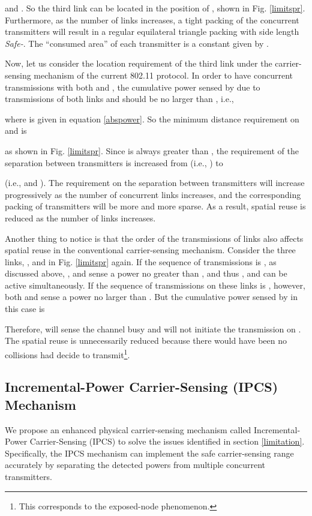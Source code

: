 \documentclass[conference]{IEEEtran}
\begin{document}
and . So the third
link can be located in the position of , shown in Fig.
\ref{limitspr}. Furthermore, as the number of links increases, a
tight packing of the concurrent transmitters will result in a
regular equilateral triangle packing with side length
\emph{Safe-}. The ``consumed area''
of each transmitter is a constant given by
.

Now, let us consider the location requirement of the third link
 under the carrier-sensing mechanism of the current 802.11
protocol. In order to have concurrent transmissions with both 
and , the cumulative power sensed by  due to transmissions
of both links  and  should be no larger than ,
i.e.,

where  is given in equation \eqref{abspower}. So the minimum
distance requirement on  and  is

as shown in Fig. \ref{limitspr}. Since  is
always greater than , the requirement of the separation between
transmitters is increased from
 (i.e.,
) to

(i.e.,  and ). The requirement on the
separation between transmitters will increase progressively as the
number of concurrent links increases, and the corresponding packing
of transmitters will be more and more sparse. As a result, spatial
reuse is reduced as the number of links increases.

Another thing to notice is that the order of the transmissions of
links also affects spatial reuse in the conventional carrier-sensing
mechanism. Consider the three links, ,  and  in Fig.
\ref{limitspr} again. If the sequence of transmissions is , as discussed above, ,  and  sense a power
no greater than , and thus ,  and  can be
active simultaneously. If the sequence of transmissions on these
links is , however, both  and  sense a
power no larger than . But the cumulative power sensed by
 in this case is

Therefore,  will sense the channel busy and will not initiate
the transmission on . The spatial reuse is unnecessarily
reduced because there would have been no collisions had  decide
to transmit\footnote[8]{This corresponds to the exposed-node
phenomenon.}.



\subsection{Incremental-Power Carrier-Sensing (IPCS) Mechanism}
We propose an enhanced physical carrier-sensing mechanism called
Incremental-Power Carrier-Sensing (IPCS) to solve the issues
identif\/ied in section \ref{limitation}. Specif\/ically, the IPCS
mechanism can implement the safe carrier-sensing range accurately by
separating the detected powers from multiple concurrent
transmitters.
\end{document}

